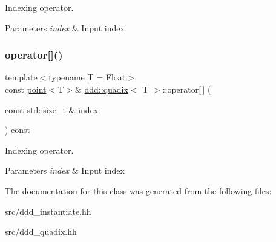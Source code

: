 Indexing operator. 


\begin{DoxyParams}{Parameters}
{\em index} & Input index \\
\hline
\end{DoxyParams}
\mbox{\label{classddd_1_1quadix_a667e457ba6c63687dad1b9822655c53a}} 
\subsubsection{\texorpdfstring{operator[]()}{operator[]()}\hspace{0.1cm}{\footnotesize\ttfamily [2/2]}}
{\footnotesize\ttfamily template$<$typename T = Float$>$ \\
const \hyperlink{classddd_1_1point}{point}$<$T$>$\& \hyperlink{classddd_1_1quadix}{ddd\+::quadix}$<$ T $>$\+::operator\mbox{[}$\,$\mbox{]} (\begin{DoxyParamCaption}\item[{const std\+::size\+\_\+t \&}]{index }\end{DoxyParamCaption}) const\hspace{0.3cm}{\ttfamily [inline]}}



Indexing operator. 


\begin{DoxyParams}{Parameters}
{\em index} & Input index \\
\hline
\end{DoxyParams}


The documentation for this class was generated from the following files\+:\begin{DoxyCompactItemize}
\item 
src/ddd\+\_\+instantiate.\+hh\item 
src/ddd\+\_\+quadix.\+hh\end{DoxyCompactItemize}

